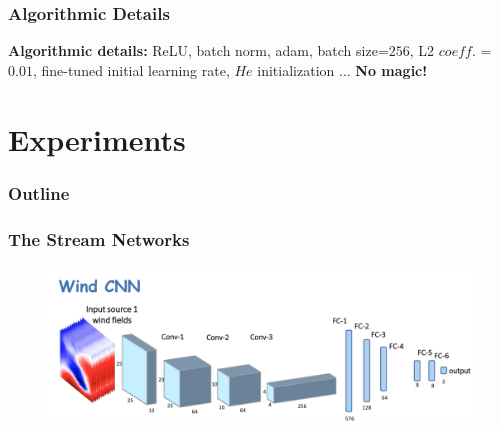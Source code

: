 \documentclass{beamer}
\begin{document}
\begin{frame}
\frametitle{Algorithmic Details}
\textbf{Algorithmic details:} ReLU, batch norm, adam, batch size=$256$, L2 $coeff.$ = $0.01$, fine-tuned initial learning rate, $He$ initialization \cite{he2015delving}... \textbf{No magic!}
\end{frame}








\section{Experiments}
\begin{frame}
\frametitle{Outline} %
\tableofcontents[currentsection] %
\end{frame}

\begin{frame}
\frametitle{The Stream Networks}
\begin{figure}
	\includegraphics[width=0.8\linewidth]{figs/wind-cnn.png}
\end{figure}
\end{frame}
\end{document}
